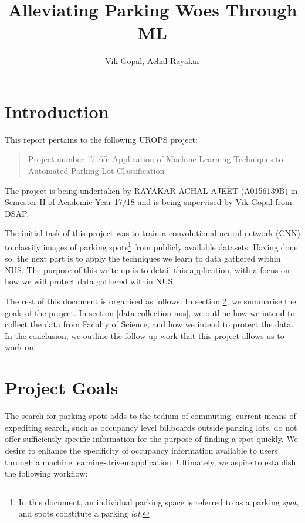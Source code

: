 \documentclass[]{article}
\title{\textbf{Alleviating Parking Woes Through ML}}
\author{Vik Gopal, Achal Rayakar}
\date{}
\let\rmarkdownfootnote\footnote%
\def\footnote{\protect\rmarkdownfootnote}
\begin{document}
\maketitle

{
\hypersetup{linkcolor=black}
\setcounter{tocdepth}{2}
\tableofcontents
}

\section{Introduction}

This report pertains to the following UROPS project:
\begin{quote}
Project number 17165: Application of
Machine Learning Techniques to Automated Parking Lot Classification
\end{quote}
The project is being undertaken by RAYAKAR ACHAL AJEET (A0156139B) in Semester II
of Academic Year 17/18 and is being supervised by Vik Gopal from DSAP. 

The initial task of this project was to train a convolutional neural network
(CNN) to classify images of parking spots\footnote{In this document, an
individual parking space is referred to as a parking \emph{spot}, and spots
constitute a parking \emph{lot}.} from publicly available datasets.  Having
done so, the next part is to apply the techniques we learn to data gathered
within NUS. The purpose of this write-up is to detail this application, with a
focus on how we will protect data gathered within NUS.

The rest of this document is organised as follows: In section
\ref{project-goals}, we summarise the goals of the project. In section
\ref{data-collection-nus}, we outline how we intend to collect the data from
Faculty of Science, and how we intend to protect the data. In the conclusion,
we outline the follow-up work that this project allows us to work on.

\section{Project Goals}
\label{project-goals}

The search for parking spots adds to the tedium of commuting; current
means of expediting search, such as occupancy level billboards outside
parking lots, do not offer sufficiently specific information for the
purpose of finding a spot quickly. We desire to enhance the specificity
of occupancy information available to users through a machine
learning-driven application. Ultimately, we aspire to establish the
following workflow: \newline
\end{document}
